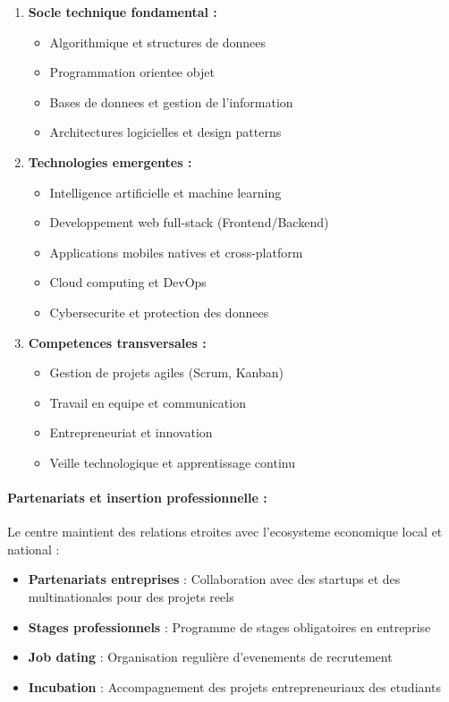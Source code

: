 \begin{enumerate}
    \item \textbf{Socle technique fondamental :}
    \begin{itemize}
        \item Algorithmique et structures de donnees
        \item Programmation orientee objet
        \item Bases de donnees et gestion de l'information
        \item Architectures logicielles et design patterns
    \end{itemize}
    
    \item \textbf{Technologies emergentes :}
    \begin{itemize}
        \item Intelligence artificielle et machine learning
        \item Developpement web full-stack (Frontend/Backend)
        \item Applications mobiles natives et cross-platform
        \item Cloud computing et DevOps
        \item Cybersecurite et protection des donnees
    \end{itemize}
    
    \item \textbf{Competences transversales :}
    \begin{itemize}
        \item Gestion de projets agiles (Scrum, Kanban)
        \item Travail en equipe et communication
        \item Entrepreneuriat et innovation
        \item Veille technologique et apprentissage continu
    \end{itemize}
\end{enumerate}

\paragraph{Partenariats et insertion professionnelle :}
Le centre maintient des relations etroites avec l'ecosysteme economique local et national :
\begin{itemize}
    \item \textbf{Partenariats entreprises} : Collaboration avec des startups et des multinationales pour des projets reels
    \item \textbf{Stages professionnels} : Programme de stages obligatoires en entreprise
    \item \textbf{Job dating} : Organisation regulière d'evenements de recrutement
    \item \textbf{Incubation} : Accompagnement des projets entrepreneuriaux des etudiants
\end{itemize}

